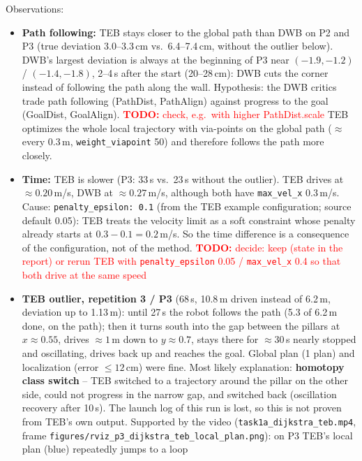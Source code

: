 \documentclass[10pt]{article}
\newcommand{\todo}[1]{\textcolor{red}{\textbf{TODO:} #1}}
\newcommand{\pkg}[1]{\texttt{#1}}
\begin{document}
Observations:
\begin{itemize}
  \item \textbf{Path following:} TEB stays closer to the global path than DWB on P2 and P3 (true deviation 3.0--3.3\,cm
        vs.\ 6.4--7.4\,cm, without the outlier below). DWB's largest deviation is always at the beginning of P3 near
        $(-1.9,-1.2)$ / $(-1.4,-1.8)$, 2--4\,s after the start (20--28\,cm): DWB cuts the corner instead of following the
        path along the wall. Hypothesis: the DWB critics trade path following (PathDist,
        PathAlign) against progress to the goal (GoalDist, GoalAlign). \todo{check, e.g.\ with higher PathDist.scale}
        TEB optimizes the whole local trajectory with via-points on the global path ($\approx$ every 0.3\,m,
        \pkg{weight\_viapoint} 50) and therefore follows the path more closely.
  \item \textbf{Time:} TEB is slower (P3: 33\,s vs.\ 23\,s without the outlier). TEB drives at $\approx 0.20$\,m/s,
        DWB at $\approx 0.27$\,m/s, although both have \pkg{max\_vel\_x} 0.3\,m/s. Cause:
        \pkg{penalty\_epsilon: 0.1} (from the TEB example configuration; source default 0.05): TEB treats the velocity
        limit as a soft constraint whose penalty already starts at $0.3 - 0.1 = 0.2$\,m/s. So the time difference is
        a consequence of the configuration, not of the method. \todo{decide: keep (state in the report) or rerun TEB
        with \pkg{penalty\_epsilon} 0.05 / \pkg{max\_vel\_x} 0.4 so that both drive at the same speed}
  \item \textbf{TEB outlier, repetition 3 / P3} (68\,s, 10.8\,m driven instead of 6.2\,m, deviation up to 1.13\,m):
        until 27\,s the robot follows the path (5.3 of 6.2\,m done, on the path); then it turns south into the gap
        between the pillars at $x \approx 0.55$, drives $\approx 1$\,m down to $y \approx 0.7$, stays there for
        $\approx 30$\,s nearly stopped and oscillating, drives back up and reaches the goal. Global plan (1 plan) and
        localization (error $\le 12$\,cm) were fine. Most likely explanation: \textbf{homotopy class switch} -- TEB
        switched to a trajectory around the pillar on the other side, could not progress in the narrow gap, and
        switched back (oscillation recovery after 10\,s). The launch log of this run is lost, so this is not proven
        from TEB's own output. Supported by the video (\pkg{task1a\_dijkstra\_teb.mp4}, frame
        \pkg{figures/rviz\_p3\_dijkstra\_teb\_local\_plan.png}): on P3 TEB's local plan (blue) repeatedly jumps to a loop

\end{itemize}
\end{document}

